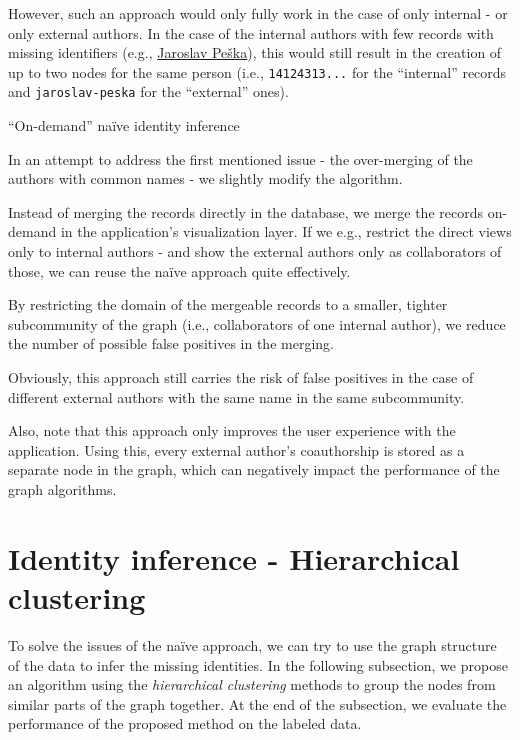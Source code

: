 However, such an approach would only fully work in the case of only internal - or only external authors.
In the case of the internal authors with few records with missing identifiers (e.g., \hyperref[fig:jaroslav-peska]{Jaroslav Peška}),
this would still result in the creation of up to two nodes for the same person (i.e., \texttt{14124313...} for the ``internal'' records and \texttt{jaroslav-peska} for the ``external'' ones).

\label{sec:on-demand-identity-inference}
\begin{mybox}{``On-demand'' naïve identity inference}

In an attempt to address the first mentioned issue - the over-merging of the authors with common names - we slightly modify the algorithm.

Instead of merging the records directly in the database, we merge the records on-demand in the application's visualization layer.
If we e.g., restrict the direct views only to internal authors - and show the external authors only as collaborators of those,
we can reuse the naïve approach quite effectively.

By restricting the domain of the mergeable records to a smaller, tighter subcommunity of the graph (i.e., collaborators of one internal author), 
we reduce the number of possible false positives in the merging.

Obviously, this approach still carries the risk of false positives in the case of different external authors with the same name in the same subcommunity.

Also, note that this approach only improves the user experience with the application.
Using this, every external author's coauthorship is stored as a separate node in the graph, which can negatively impact the performance of the graph algorithms.
\end{mybox}

\section{Identity inference - Hierarchical clustering}

To solve the issues of the naïve approach, we can try to use the graph structure of the data to infer the missing identities.
In the following subsection, we propose an algorithm using the \textit{hierarchical clustering} methods to group the nodes from similar parts of the graph together.
At the end of the subsection, we evaluate the performance of the proposed method on the labeled data.

